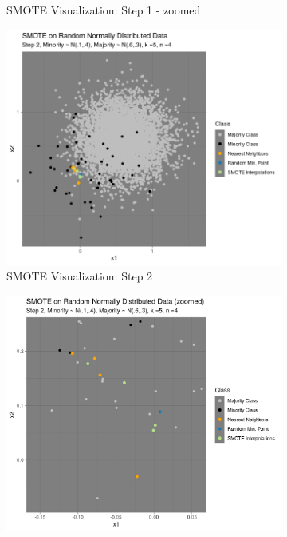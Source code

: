 \documentclass[12pt,a4paper]{article}
\begin{document}
\begin{figure}[]
\begin{subfigure}{0.48\textwidth}
\caption{SMOTE Visualization: Step 1 - zoomed} \label{fig:b}
\end{subfigure}
\medskip
\begin{subfigure}{0.48\textwidth}
\includegraphics[width=\linewidth]{./graphics/knn002.png}
\caption{SMOTE Visualization: Step 2} \label{fig:a}
\end{subfigure}\hspace*{\fill}
\begin{subfigure}{0.48\textwidth}
\includegraphics[width=\linewidth]{./graphics/knn_zoom002.png}

\end{subfigure}
\end{figure}
\end{document}
